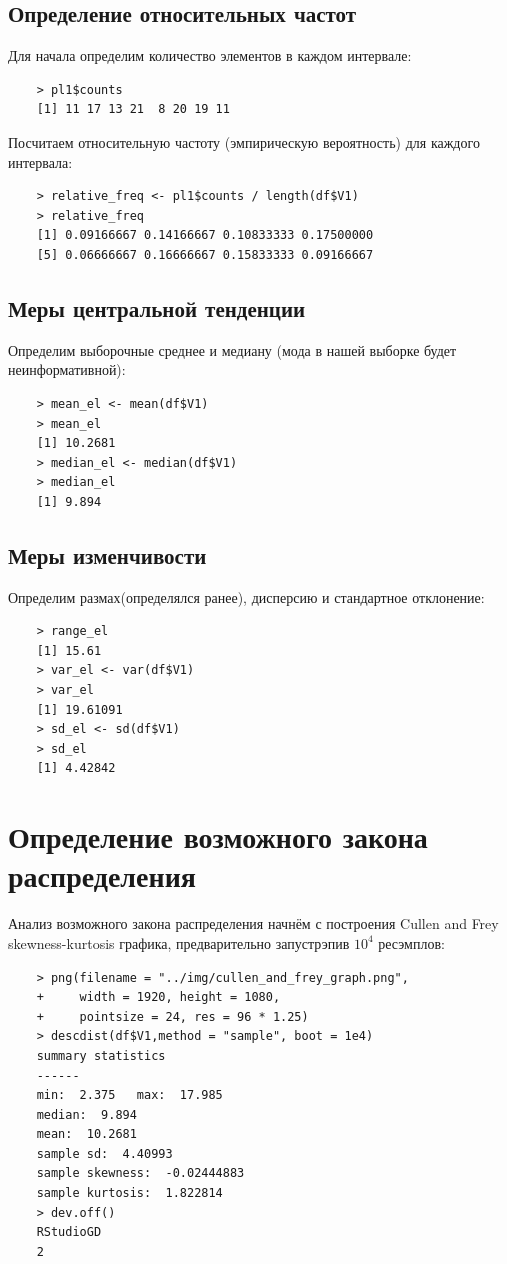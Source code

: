 \documentclass[14pt,a4paper]{scrartcl}
\begin{document}
\subsection{Определение относительных частот}
Для начала определим количество элементов в каждом интервале:
\begin{lstlisting}
	> pl1$counts
	[1] 11 17 13 21  8 20 19 11
\end{lstlisting}

Посчитаем относительную частоту (эмпирическую вероятность) для каждого интервала:
\begin{lstlisting}
	> relative_freq <- pl1$counts / length(df$V1)
	> relative_freq
	[1] 0.09166667 0.14166667 0.10833333 0.17500000
	[5] 0.06666667 0.16666667 0.15833333 0.09166667
\end{lstlisting}

\subsection{Меры центральной тенденции}
Определим выборочные среднее и медиану (мода в нашей выборке будет неинформативной):
\begin{lstlisting}
	> mean_el <- mean(df$V1)
	> mean_el
	[1] 10.2681
	> median_el <- median(df$V1)
	> median_el
	[1] 9.894
\end{lstlisting}

\subsection{Меры изменчивости}
Определим размах(определялся ранее), дисперсию и стандартное отклонение:
\begin{lstlisting}
	> range_el
	[1] 15.61
	> var_el <- var(df$V1)
	> var_el
	[1] 19.61091
	> sd_el <- sd(df$V1)
	> sd_el
	[1] 4.42842
\end{lstlisting}


\section{Определение возможного закона распределения}
Анализ возможного закона распределения начнём с построения Cullen and Frey skewness-kurtosis графика, предварительно запустрэпив $10^4$ ресэмплов:
\begin{lstlisting}
	> png(filename = "../img/cullen_and_frey_graph.png", 
	+     width = 1920, height = 1080,
	+     pointsize = 24, res = 96 * 1.25)
	> descdist(df$V1,method = "sample", boot = 1e4)
	summary statistics
	------
	min:  2.375   max:  17.985 
	median:  9.894 
	mean:  10.2681 
	sample sd:  4.40993 
	sample skewness:  -0.02444883 
	sample kurtosis:  1.822814 
	> dev.off()
	RStudioGD 
	2 
\end{lstlisting}
\end{document}
